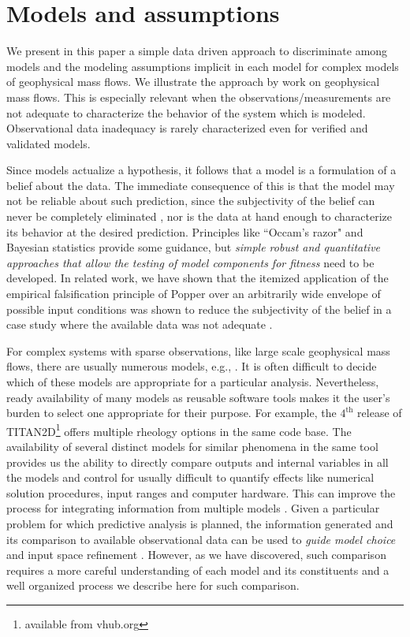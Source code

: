 
\section{Models and assumptions}
We present in this paper a simple data driven approach to discriminate among models and the modeling assumptions implicit in each model for complex models of geophysical mass flows. We illustrate the approach by work on geophysical mass flows.
This is especially relevant when the observations/measurements are not adequate to characterize the behavior of the system which is modeled. Observational { data inadequacy} is rarely characterized even for verified and validated models. 

Since models actualize a hypothesis, it follows  that a model is a formulation of a belief about the data. The immediate consequence of this is that the model may not be reliable about such prediction, since the {subjectivity of the belief} can never be completely eliminated \citep{Kennedy2001, Higdon2004}, nor is  the data at hand  enough to characterize its behavior at the desired prediction. Principles like ``Occam's razor" and Bayesian statistics \citep{Farrell2015} provide some guidance, but {\it simple robust and quantitative approaches that allow the  testing of model components for fitness }need to be developed. In related work, we have shown that the itemized application of the empirical falsification principle of  Popper \citep{Popper1959} over an arbitrarily wide envelope of possible input conditions was shown to reduce the subjectivity of the belief in a case study where the available data was not adequate \citep{Bevilacqua2019}.%

For complex systems with sparse observations, like large scale geophysical mass flows, there  are usually numerous models, e.g., \cite{Kelfoun2011}. It is often difficult to decide which of these models are appropriate for a particular analysis. Nevertheless, ready availability of many models as reusable software tools makes it the user's burden to select one appropriate for their purpose.
For example, the $\mathrm{4^{\mathrm{th}}}$ release of TITAN2D\footnote{available from vhub.org} offers multiple rheology options in the same code base. The availability of several distinct models for similar phenomena in the same tool provides us the ability to directly compare outputs and internal variables in all the models and control for usually difficult to quantify effects like numerical solution procedures, input ranges and computer hardware. This can improve the process for integrating information from multiple models \citep{Bongard2007}. Given a particular problem for which predictive analysis is planned, the information generated and its comparison to available observational data can be used to {\it guide model choice }and input space refinement \citep{Bevilacqua2019}.
However, as we have discovered, such comparison requires a more careful understanding of each model and its constituents and a well organized process we describe here for such comparison. %

